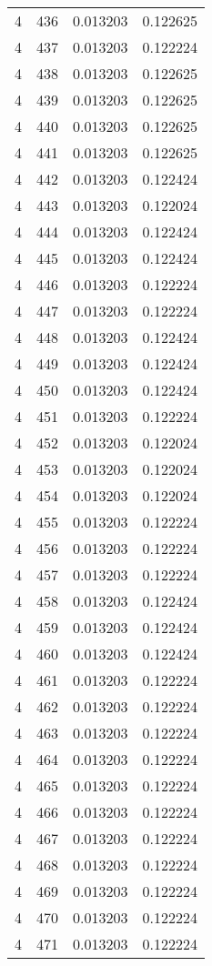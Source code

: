 \begin{longtable}{rrrr}
4 & 436 & 0.013203 & 0.122625 \\
4 & 437 & 0.013203 & 0.122224 \\
4 & 438 & 0.013203 & 0.122625 \\
4 & 439 & 0.013203 & 0.122625 \\
4 & 440 & 0.013203 & 0.122625 \\
4 & 441 & 0.013203 & 0.122625 \\
4 & 442 & 0.013203 & 0.122424 \\
4 & 443 & 0.013203 & 0.122024 \\
4 & 444 & 0.013203 & 0.122424 \\
4 & 445 & 0.013203 & 0.122424 \\
4 & 446 & 0.013203 & 0.122224 \\
4 & 447 & 0.013203 & 0.122224 \\
4 & 448 & 0.013203 & 0.122424 \\
4 & 449 & 0.013203 & 0.122424 \\
4 & 450 & 0.013203 & 0.122424 \\
4 & 451 & 0.013203 & 0.122224 \\
4 & 452 & 0.013203 & 0.122024 \\
4 & 453 & 0.013203 & 0.122024 \\
4 & 454 & 0.013203 & 0.122024 \\
4 & 455 & 0.013203 & 0.122224 \\
4 & 456 & 0.013203 & 0.122224 \\
4 & 457 & 0.013203 & 0.122224 \\
4 & 458 & 0.013203 & 0.122424 \\
4 & 459 & 0.013203 & 0.122424 \\
4 & 460 & 0.013203 & 0.122424 \\
4 & 461 & 0.013203 & 0.122224 \\
4 & 462 & 0.013203 & 0.122224 \\
4 & 463 & 0.013203 & 0.122224 \\
4 & 464 & 0.013203 & 0.122224 \\
4 & 465 & 0.013203 & 0.122224 \\
4 & 466 & 0.013203 & 0.122224 \\
4 & 467 & 0.013203 & 0.122224 \\
4 & 468 & 0.013203 & 0.122224 \\
4 & 469 & 0.013203 & 0.122224 \\
4 & 470 & 0.013203 & 0.122224 \\
4 & 471 & 0.013203 & 0.122224 \\

\end{longtable}
